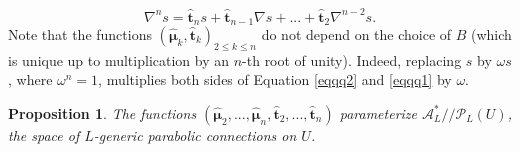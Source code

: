 \documentclass[11pt]{amsart}
\newtheorem{prop}[thm]{Proposition}
\newtheorem{Remark}[thm]{Remark}
\numberwithin{thm}{section} %
\numberwithin{equation}{section} %
\numberwithin{figure}{section} %
\begin{document}
\begin{equation}\label{eqqq1}
\nabla^n s = \bm\hat{t}_{n}s + \bm\hat{t}_{n-1} \nabla s+...+\bm\hat{t}_{2}\nabla^{n-2}s.
\end{equation}
Note that the functions $(\bm\hat{\mu}_k,\bm\hat{t}_k)_{2\leq k\leq n}$ do not depend on the choice of $B$ (which is unique up to multiplication by an $n$-th root of unity). Indeed, replacing $s$ by $\omega s$, where $\omega^n=1$, multiplies both sides of Equation \eqref{eqqq2} and \eqref{eqqq1} by $\omega$. 


\begin{prop}\label{Prop:para-L-para-conns}
The functions $(\bm\hat{\mu}_2, ..., \bm\hat{\mu}_n, \bm\hat{t}_{2}, ..., \bm\hat{t}_{n})$ parameterize $\mathcal{A}^*_L//\mathcal{P}_L(U)$, the space of $L$-generic parabolic connections on $U$.
\end{prop}
\end{document}
